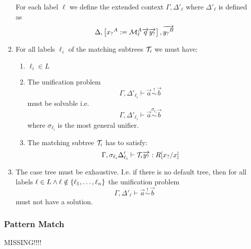 \begin{enumerate}
        For each label $\ell$ we define the extended context $\Gamma,
        \Delta'_\ell$ where $\Delta'_\ell$ is defined as
        $$
            \Delta,
            \left[ {
                {x_?}^A := {\cal M}^A_{\ell} {\overrightarrow {q}} {\overrightarrow {{y_?}}}
            } \right],
            {\overrightarrow {{y_?}^B}}
        $$

    \item
        For all labels $\ell_i$ of the matching subtrees ${\mathcal T}_i$ we must have:
        \begin{enumerate}

            \item $\ell_i \in L$


            \item The unification problem
                $$
                \Gamma, \Delta'_{\ell_i}
                \vdash
                \vec a \stackrel ! \sim \vec b
                $$
                must be solvable i.e.
                $$
                \Gamma, \Delta'_{\ell_i}
                \vdash
                \vec a \stackrel {\sigma_{\ell_i}} \sim \vec b
                $$
                where $\sigma_{\ell_i}$ is the most general unifier.

            \item The matching subtree ${\mathcal T}_i$ has to satisfy:
                $$
                \Gamma, \sigma_{\ell_i} \Delta'_{\ell_i}
                \vdash
                {\mathcal T}_i {\overrightarrow {{y_?}}}
                :
                R[{x_?} / x]
                $$

        \end{enumerate}


    \item The case tree must be exhaustive. I.e. if there is no default tree,
        then for all labels
        $
            \ell \in L
            \land
            \ell \notin {\{\ell_1, \ldots, \ell_n\}}
        $
        the unification problem
        $$
        \Gamma, \Delta'_\ell
        \vdash
        \vec a \stackrel ! \sim \vec b
        $$
        must not have a solution.
\end{enumerate}






\subsubsection{Pattern Match}


MISSING!!!!
